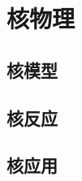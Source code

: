 

\section{核物理}\label{30-2}

\subsection{核模型}\label{30-2-1}

\subsection{核反应}\label{30-2-2}

\subsection{核应用}\label{31-2-3}